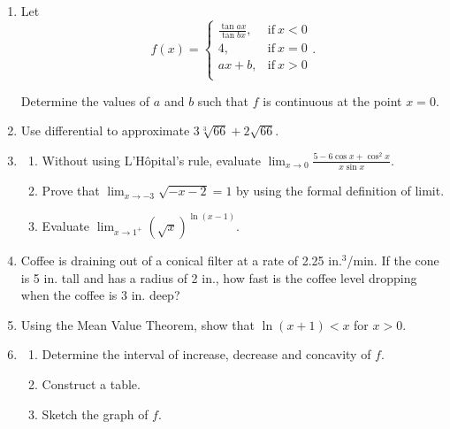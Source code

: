 \documentclass[a4paper, 12pt]{article}
\begin{document}
\begin{enumerate}[leftmargin=*,label=\textbf{\arabic*.}]
\item Let
\[
f(x) =
\begin{cases}
\displaystyle \frac{\tan ax}{\tan bx}, & \text{if}\ x < 0 \\[1em]
4, & \text{if}\ x = 0 \\[1em]
ax+b, & \text{if}\ x >0 \\
\end{cases}.
\]

Determine the values of $a$ and $b$ such that $f$ is continuous at the point $x=0$.

\item Use differential to approximate $3\sqrt[3]{66}+2\sqrt{66}$.

\item
\begin{enumerate}[leftmargin=*,label=\textbf{\alph*.}]
\item Without using L'Hôpital's rule, evaluate $\displaystyle \lim_{x\to 0} \frac{5-6\cos x + \cos^2x}{x\sin x}$.

\item Prove that $\displaystyle \lim_{x\to -3} \sqrt{-x-2} = 1$ by using the formal definition of limit.

\item Evaluate $\displaystyle\lim_{x\to1^+}\left(\sqrt x\right)^{\ln(x-1)}$.
\end{enumerate}

\item Coffee is draining out of a conical filter at a rate of 2.25 in.$^3$/min. If the cone is 5 in. tall and has a radius of 2 in., how fast is the coffee level dropping when the coffee is 3 in. deep?

\item Using the Mean Value Theorem, show that $\ln(x+1) < x$ for $x > 0$.

\item
\begin{enumerate}[leftmargin=*,label=\textbf{\alph*.}]
\item Determine the interval of increase, decrease and concavity of $f$.
\item Construct a table.
\item Sketch the graph of $f$.
\end{enumerate}
\end{enumerate}

\newpage
{}
{}
\end{document}
